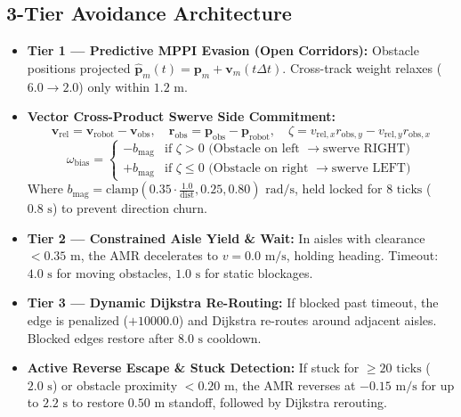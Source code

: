 \documentclass[10pt,a4paper]{article}
\begin{document}
\subsection{3-Tier Avoidance Architecture}
\begin{itemize}
    \item \textbf{Tier 1 — Predictive MPPI Evasion (Open Corridors):} Obstacle positions projected $\hat{\mathbf{p}}_m(t) = \mathbf{p}_m + \mathbf{v}_m (t\Delta t)$. Cross-track weight relaxes ($6.0 \to 2.0$) only within $1.2\text{ m}$.
    \item \textbf{Vector Cross-Product Swerve Side Commitment:}
    \begin{equation}
    \mathbf{v}_{\text{rel}} = \mathbf{v}_{\text{robot}} - \mathbf{v}_{\text{obs}}, \quad \mathbf{r}_{\text{obs}} = \mathbf{p}_{\text{obs}} - \mathbf{p}_{\text{robot}}, \quad \zeta = v_{\text{rel}, x} r_{\text{obs}, y} - v_{\text{rel}, y} r_{\text{obs}, x}
    \end{equation}
    \begin{equation}
    \omega_{\text{bias}} = \begin{cases} -b_{\text{mag}} & \text{if } \zeta > 0 \text{ (Obstacle on left } \to \text{swerve RIGHT)} \\ +b_{\text{mag}} & \text{if } \zeta \le 0 \text{ (Obstacle on right } \to \text{swerve LEFT)} \end{cases}
    \end{equation}
    Where $b_{\text{mag}} = \text{clamp}(0.35 \cdot \frac{1.0}{\text{dist}}, 0.25, 0.80)\text{ rad/s}$, held locked for $8\text{ ticks}$ ($0.8\text{ s}$) to prevent direction churn.
    \item \textbf{Tier 2 — Constrained Aisle Yield \& Wait:} In aisles with clearance $< 0.35\text{ m}$, the AMR decelerates to $v = 0.0\text{ m/s}$, holding heading. Timeout: $4.0\text{ s}$ for moving obstacles, $1.0\text{ s}$ for static blockages.
    \item \textbf{Tier 3 — Dynamic Dijkstra Re-Routing:} If blocked past timeout, the edge is penalized ($+10000.0$) and Dijkstra re-routes around adjacent aisles. Blocked edges restore after $8.0\text{ s}$ cooldown.
    \item \textbf{Active Reverse Escape \& Stuck Detection:} If stuck for $\ge 20\text{ ticks}$ ($2.0\text{ s}$) or obstacle proximity $< 0.20\text{ m}$, the AMR reverses at $-0.15\text{ m/s}$ for up to $2.2\text{ s}$ to restore $0.50\text{ m}$ standoff, followed by Dijkstra rerouting.
\end{itemize}
\end{document}
